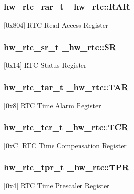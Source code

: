 \subsubsection[{\texorpdfstring{R\+AR}{RAR}}]{ {\bf hw\+\_\+rtc\+\_\+rar\+\_\+t} \+\_\+hw\+\_\+rtc\+::\+R\+AR}\hypertarget{struct__hw__rtc_ac76bf33bbadf6eae55d99f2f060052c1}{}\label{struct__hw__rtc_ac76bf33bbadf6eae55d99f2f060052c1}
\mbox{[}0x804\mbox{]} R\+TC Read Access Register 
\subsubsection[{\texorpdfstring{SR}{SR}}]{ {\bf hw\+\_\+rtc\+\_\+sr\+\_\+t} \+\_\+hw\+\_\+rtc\+::\+SR}\hypertarget{struct__hw__rtc_a8f41164b6b77cd59ace74fd7195746a2}{}\label{struct__hw__rtc_a8f41164b6b77cd59ace74fd7195746a2}
\mbox{[}0x14\mbox{]} R\+TC Status Register 
\subsubsection[{\texorpdfstring{T\+AR}{TAR}}]{ {\bf hw\+\_\+rtc\+\_\+tar\+\_\+t} \+\_\+hw\+\_\+rtc\+::\+T\+AR}\hypertarget{struct__hw__rtc_a11dc25112e4ba76d809648d14fcb8839}{}\label{struct__hw__rtc_a11dc25112e4ba76d809648d14fcb8839}
\mbox{[}0x8\mbox{]} R\+TC Time Alarm Register 
\subsubsection[{\texorpdfstring{T\+CR}{TCR}}]{ {\bf hw\+\_\+rtc\+\_\+tcr\+\_\+t} \+\_\+hw\+\_\+rtc\+::\+T\+CR}\hypertarget{struct__hw__rtc_a7f6233d069c5a25e3716216d37cafaf6}{}\label{struct__hw__rtc_a7f6233d069c5a25e3716216d37cafaf6}
\mbox{[}0xC\mbox{]} R\+TC Time Compensation Register 
\subsubsection[{\texorpdfstring{T\+PR}{TPR}}]{ {\bf hw\+\_\+rtc\+\_\+tpr\+\_\+t} \+\_\+hw\+\_\+rtc\+::\+T\+PR}\hypertarget{struct__hw__rtc_a88e5a08718be18d95b23a90dc8bcc88f}{}\label{struct__hw__rtc_a88e5a08718be18d95b23a90dc8bcc88f}
\mbox{[}0x4\mbox{]} R\+TC Time Prescaler Register 
